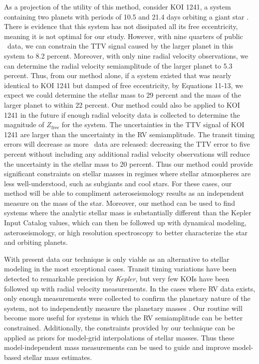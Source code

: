 As a projection of the utility of this method, consider KOI 1241, a system containing two planets with periods of 10.5 and 21.4 days orbiting a giant star \citep[$R = 3.14 R_\odot$,][]{Steffen12b}. There is evidence that this system has not dissipated all its free eccentricity, meaning it is not optimal for our study. However, with nine quarters of public \kep\ data, we can constrain the TTV signal caused by the larger planet in this system to 8.2 percent. Moreover, with only nine radial velocity observations, we can determine the radial velocity semiamplitude of the larger planet to 5.3 percent. Thus, from our method alone, if a system existed that was nearly identical to KOI 1241 but damped of free eccentricity, by Equations 11-13, we expect we could determine the stellar mass to 29 percent and the mass of the larger planet to within 22 percent. Our method could also be applied to KOI 1241 in the future if enough radial velocity data is collected to determine the magnitude of $Z_\textrm{free}$ for the system. The uncertainties in the TTV signal of KOI 1241 are larger than the uncertainty in the RV semiamplitude. The transit timing errors will decrease as more \kep\ data are released: decreasing the TTV error to five percent without including any additional radial velocity observations will reduce the uncertainty in the stellar mass to 20 percent. Thus our method could provide significant constraints on stellar masses in regimes where stellar atmospheres are less well-understood, such as subgiants and cool stars. For these cases, our method will be able to compliment asteroseismology results as an independent measure on the mass of the star. Moreover, our method can be used to find systems where the analytic stellar mass is substantially different than the Kepler Input Catalog values, which can then be followed up with dynamical modeling, asteroseismology, or high resolution spectroscopy to better characterize the star and orbiting planets.

With present data our technique is only viable as an alternative to stellar modeling in the most exceptional cases. Transit timing variations have been detected to remarkable precision by \textit{Kepler}, but very few KOIs have been followed up with radial velocity measurements. In the cases where RV data exists, only enough measurements were collected to confirm the planetary nature of the system, not to independently measure the planetary masses \citep{Holman10}. Our routine will become more useful for systems in which the RV semiamplitude can be better constrained. Additionally, the constraints provided by our technique can be applied as priors for model-grid interpolations of stellar masses. Thus these model-independent mass measurements can be used to guide and improve model-based stellar mass estimates.

